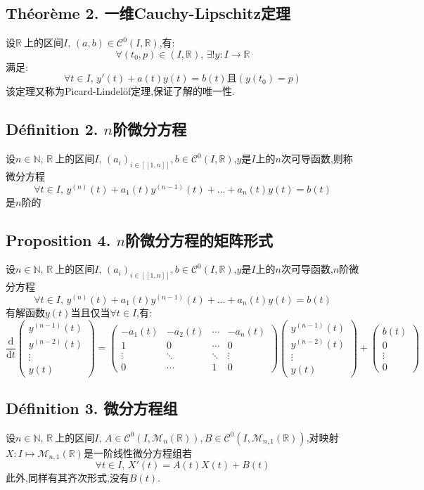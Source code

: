 \documentclass[12pt, a4paper, oneside]{ctexbook}
\newcommand{\di }{\text{d}}%
\newcommand{\R }{\mathbb{R}}%
\newcommand{\RR }{$\R\ $}%
\newcommand{\N }{\mathbb{N}}%
\newcommand{\C }{\mathcal{C}}%
\newcommand{\M }{\mathcal{M}}%
\newcommand{\n }{$n$}\newcommand{\f  }{$ f $}
\begin{document}
  \subsection{Théorème 2. 一维Cauchy-Lipschitz定理}
  设\RR 上的区间$I,\,(a,b)\in\C^0(I,\R)$,有:
  $$
  \forall(t_0,p)\in(I,\R),\,\exists!y:I\rightarrow\R
  $$
  满足:
  $$
  \forall t\in I,\,y'(t)+a(t)y(t)=b(t)\text{且} (y(t_0)=p)
  $$
  该定理又称为Picard-Lindelöf定理,保证了解的唯一性.
  \subsection{Définition 2. \n 阶微分方程}
  设$n\in\N$, \RR 上的区间$I,\,(a_i)_{i\in[\![1,n]\!]},b\in\C^0(I,\R)$,$y$是$I$上的\n 次可导函数,则称微分方程
  $$
  \forall t\in I,\,y^{(n)}(t)+a_1(t)y^{(n-1)}(t)+\dots+a_n(t)y(t)=b(t)
  $$
  是\n 阶的
  \subsection{Proposition 4. \n 阶微分方程的矩阵形式}
  设$n\in\N$, \RR 上的区间$I,\,(a_i)_{i\in[\![1,n]\!]},b\in\C^0(I,\R)$,$y$是$I$上的\n 次可导函数,\n 阶微分方程
  $$
  \forall t\in I,\,y^{(n)}(t)+a_1(t)y^{(n-1)}(t)+\dots+a_n(t)y(t)=b(t)
  $$
  有解函数$y(t)$当且仅当$\forall t\in I$,有:
  $$
  \frac{\di}{\di t}\begin{pmatrix}
    y^{(n-1)}(t)\\
    y^{(n-2)}(t)\\
    \vdots\\
   y(t)
    \end{pmatrix}
   =
   \begin{pmatrix}
    -a_1(t)&-a_2(t)  &\cdots  &-a_n(t) \\
    1&  0& \cdots &0 \\
    \vdots&\ddots  &\ddots  & \vdots\\
    0& \cdots &  1&0
  \end{pmatrix}
  \begin{pmatrix}
    y^{(n-1)}(t)\\
    y^{(n-2)}(t)\\
    \vdots\\
   y(t)
    \end{pmatrix}
    +\begin{pmatrix}
      b(t)\\
      0\\
      \vdots\\
     0
      \end{pmatrix}
  $$
  \subsection{Définition 3. 微分方程组}
  设$n\in\N$, \RR 上的区间$I,\,A\in\C^0(I,\M_n(\R)),B\in\C^0(I,\M_{n,1}(\R))$,对映射$X:I\mapsto \M_{n,1}(\R)$是一阶线性微分方程组若
  $$
  \forall t\in I,\,X'(t)=A(t)X(t)+B(t)
  $$
  此外,同样有其齐次形式,没有$B(t)$.
\end{document}
